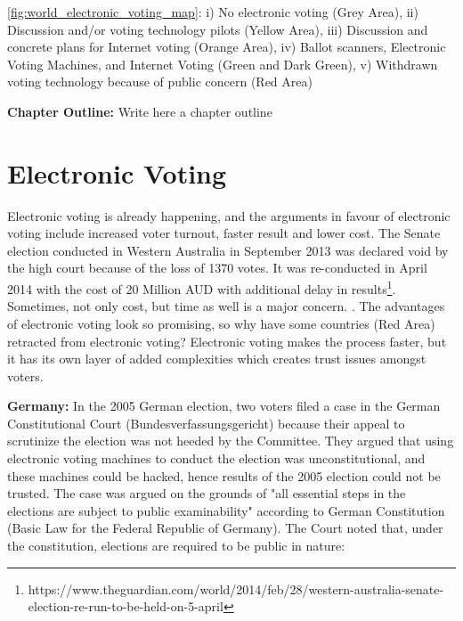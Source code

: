   \ref{fig:world_electronic_voting_map}: i) No electronic voting (Grey Area), ii)
  Discussion and/or voting technology pilots (Yellow Area), 
  iii) Discussion and concrete plans for Internet voting (Orange Area),
  iv) Ballot scanners, Electronic Voting Machines, and Internet Voting (Green and Dark Green),
  v) Withdrawn voting technology because of public concern (Red Area) 
%  
 
\textbf{Chapter Outline:}
  Write here a chapter outline
   
\section{Electronic Voting}
  Electronic voting is already happening, and the
  arguments in favour of electronic voting 
  include increased voter turnout, faster result and lower cost. The Senate 
  election conducted in Western Australia in September 2013 was 
  declared void by the high court because of the loss of 1370 votes. It was 
  re-conducted in April 2014 with the cost of 20 Million 
  AUD with additional  delay in results\footnote{https://www.theguardian.com/world/2014/feb/28/western-australia-senate-election-re-run-to-be-held-on-5-april}. Sometimes, 
  not only cost, but time as well is a major concern.
  . 
  The advantages of electronic voting 
  look so promising, so why have some countries (Red Area) retracted 
  from electronic voting? Electronic voting makes 
  the process faster, but it has its own layer of added complexities 
  which creates trust issues amongst voters. 
  
  \textbf{Germany:} In the 2005 German election, two voters filed a case in the German 
  Constitutional Court (Bundesverfassungsgericht) because their 
  appeal to scrutinize the election 
  was not heeded by the Committee. They argued that using electronic 
  voting machines to conduct the election was unconstitutional, and 
  these machines could be hacked, hence results of the 2005 election 
  could not be trusted. The case was argued on the grounds 
  of "all essential steps in the elections are subject to 
  public examinability" according to German Constitution 
  (Basic Law for the Federal Republic of Germany). 
  The Court noted that, under the constitution, elections are 
  required to be public in nature:
  
